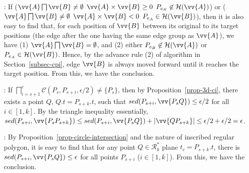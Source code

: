 :
If ($\vv{A} \bigsqcap \vv{B} \ne \emptyset$ \And $\vv{A} \times \vv{B} \ge 0$ \And $P_{e_B} \not \in \mathcal{H}(\vv{A})$) or ($\vv{A} \bigsqcap \vv{B} \ne \emptyset$ \And $\vv{A} \times \vv{B} < 0$ \And $P_{e_A} \in \mathcal{H}(\vv{B})$), then it is also easy to find that, for each position of $\vv{B}$ between its original to its target positions (\ie the edge after the one having the same edge group as $\vv{A}$), we have (1) $\vv{A} \bigsqcap \vv{B} = \emptyset$, and (2) either $P_{e_B} \not \in \mathcal{H}(\vv{A})$ or $P_{e_A} \in \mathcal{H}(\vv{B})$. Hence, by the advance rule (2) of algorithm \cpia in Section~\ref{subsec-cpi}, edge $\vv{B}$ is always moved forward until it reaches the target position. From this, we have the conclusion. \eop



:
If $\bigsqcap_{i=s+1}^{e}{\mathcal{C}(P_s, P_{s+i}, \epsilon/2)} \ne \{P_s\}$, then by Proposition~\ref{prop-3d-ci}, there exists a point $Q$, $Q.t = P_{s+k}.t$, such that $sed(P_{s+i}, \vv{P_sQ})\le \epsilon/2$ for all $i \in [1,k]$. By the triangle inequality essentially, $sed(P_{s+i}, \vv{P_sP_{s+k}})\le  sed(P_{s+i}, \vv{P_sQ}) + |\vv{QP_{s+k}}| \le  \epsilon/2+\epsilon/2 = \epsilon$. \eop


:
By Proposition~\ref{prop-circle-intersection} and the nature of inscribed regular polygon, it is easy to find that for any point $Q \in \mathcal{R}^*_k$  \wrt plane $t_c=P_{s+k}.t$, there is $sed(P_{s+i}, \vv{P_sQ})\le \epsilon$ for all points $P_{s+i}$ ($i \in [1,k]$).
From this, we have the conclusion. \eop


